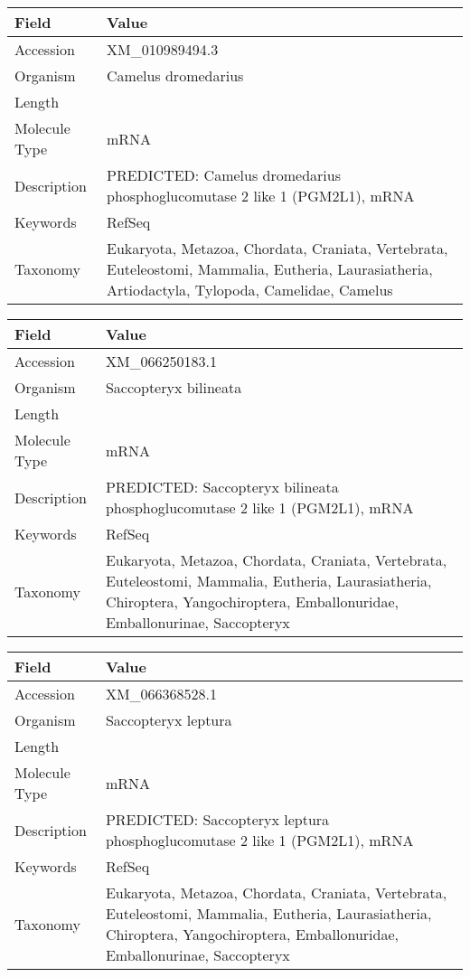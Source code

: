 \documentclass[10pt]{article}
\begin{document}
\vspace{1em}
{\footnotesize
\begin{longtable}{>{\raggedright\arraybackslash}p{4.5cm} >{\raggedright\arraybackslash}p{11.5cm}}
\textbf{Field} & \textbf{Value} \\
\hline
Accession & XM\_010989494.3 \\
Organism & Camelus dromedarius \\
Length & 6608 \\
Molecule Type & mRNA \\
Description & PREDICTED: Camelus dromedarius phosphoglucomutase 2 like 1 (PGM2L1), mRNA \\
Keywords & RefSeq \\
Taxonomy & Eukaryota, Metazoa, Chordata, Craniata, Vertebrata, Euteleostomi, Mammalia, Eutheria, Laurasiatheria, Artiodactyla, Tylopoda, Camelidae, Camelus \\
\end{longtable}
}

\vspace{1em}
{\footnotesize
\begin{longtable}{>{\raggedright\arraybackslash}p{4.5cm} >{\raggedright\arraybackslash}p{11.5cm}}
\textbf{Field} & \textbf{Value} \\
\hline
Accession & XM\_066250183.1 \\
Organism & Saccopteryx bilineata \\
Length & 7821 \\
Molecule Type & mRNA \\
Description & PREDICTED: Saccopteryx bilineata phosphoglucomutase 2 like 1 (PGM2L1), mRNA \\
Keywords & RefSeq \\
Taxonomy & Eukaryota, Metazoa, Chordata, Craniata, Vertebrata, Euteleostomi, Mammalia, Eutheria, Laurasiatheria, Chiroptera, Yangochiroptera, Emballonuridae, Emballonurinae, Saccopteryx \\
\end{longtable}
}

\vspace{1em}
{\footnotesize
\begin{longtable}{>{\raggedright\arraybackslash}p{4.5cm} >{\raggedright\arraybackslash}p{11.5cm}}
\textbf{Field} & \textbf{Value} \\
\hline
Accession & XM\_066368528.1 \\
Organism & Saccopteryx leptura \\
Length & 7222 \\
Molecule Type & mRNA \\
Description & PREDICTED: Saccopteryx leptura phosphoglucomutase 2 like 1 (PGM2L1), mRNA \\
Keywords & RefSeq \\
Taxonomy & Eukaryota, Metazoa, Chordata, Craniata, Vertebrata, Euteleostomi, Mammalia, Eutheria, Laurasiatheria, Chiroptera, Yangochiroptera, Emballonuridae, Emballonurinae, Saccopteryx \\
\end{longtable}
}
\end{document}
